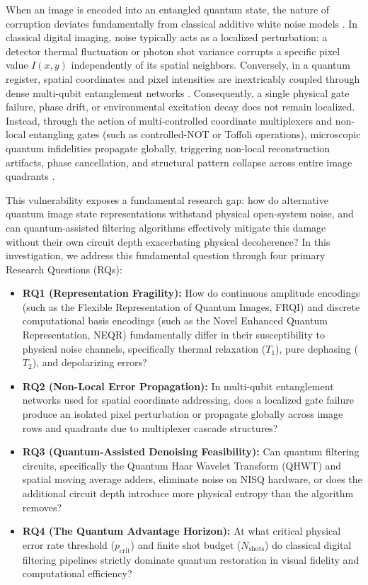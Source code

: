\documentclass[12pt,onecolumn,draftclsnofoot]{IEEEtran}
\begin{document}
When an image is encoded into an entangled quantum state, the nature of corruption deviates fundamentally from classical additive white noise models \cite{dabov2007image}. In classical digital imaging, noise typically acts as a localized perturbation: a detector thermal fluctuation or photon shot variance corrupts a specific pixel value $I(x, y)$ independently of its spatial neighbors. Conversely, in a quantum register, spatial coordinates and pixel intensities are inextricably coupled through dense multi-qubit entanglement networks \cite{le2011flexible, zhang2013neqr}. Consequently, a single physical gate failure, phase drift, or environmental excitation decay does not remain localized. Instead, through the action of multi-controlled coordinate multiplexers and non-local entangling gates (such as controlled-NOT or Toffoli operations), microscopic quantum infidelities propagate globally, triggering non-local reconstruction artifacts, phase cancellation, and structural pattern collapse across entire image quadrants \cite{temme2017error, li2017efficient}.

This vulnerability exposes a fundamental research gap: how do alternative quantum image state representations withstand physical open-system noise, and can quantum-assisted filtering algorithms effectively mitigate this damage without their own circuit depth exacerbating physical decoherence? In this investigation, we address this fundamental question through four primary Research Questions (RQs):
\begin{itemize}
    \item \textbf{RQ1 (Representation Fragility):} How do continuous amplitude encodings (such as the Flexible Representation of Quantum Images, FRQI) and discrete computational basis encodings (such as the Novel Enhanced Quantum Representation, NEQR) fundamentally differ in their susceptibility to physical noise channels, specifically thermal relaxation ($T_1$), pure dephasing ($T_2$), and depolarizing errors?
    \item \textbf{RQ2 (Non-Local Error Propagation):} In multi-qubit entanglement networks used for spatial coordinate addressing, does a localized gate failure produce an isolated pixel perturbation or propagate globally across image rows and quadrants due to multiplexer cascade structures?
    \item \textbf{RQ3 (Quantum-Assisted Denoising Feasibility):} Can quantum filtering circuits, specifically the Quantum Haar Wavelet Transform (QHWT) and spatial moving average adders, eliminate noise on NISQ hardware, or does the additional circuit depth introduce more physical entropy than the algorithm removes?
    \item \textbf{RQ4 (The Quantum Advantage Horizon):} At what critical physical error rate threshold ($p_{\text{crit}}$) and finite shot budget ($N_{\text{shots}}$) do classical digital filtering pipelines strictly dominate quantum restoration in visual fidelity and computational efficiency?
\end{itemize}
\end{document}
